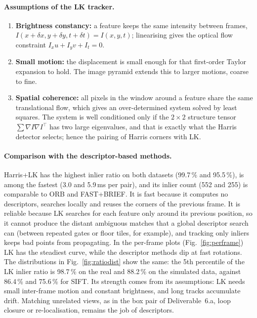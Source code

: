 \documentclass[11pt,a4paper]{article}
\begin{document}
\paragraph{Assumptions of the LK tracker.}
\begin{enumerate}
  \item \textbf{Brightness constancy:} a feature keeps the same intensity between
    frames, $I(x+\delta x, y+\delta y, t+\delta t)=I(x,y,t)$; linearising gives the optical
    flow constraint $I_x u + I_y v + I_t = 0$.
  \item \textbf{Small motion:} the displacement is small enough for that first-order
    Taylor expansion to hold. The image pyramid extends this to larger motions, coarse to
    fine.
  \item \textbf{Spatial coherence:} all pixels in the window around a feature share the
    same translational flow, which gives an over-determined system solved by least
    squares. The system is well conditioned only if the $2\times2$ structure tensor
    $\sum\nabla I\nabla I^\top$ has two large eigenvalues, and that is exactly what the
    Harris detector selects; hence the pairing of Harris corners with LK.
\end{enumerate}

\paragraph{Comparison with the descriptor-based methods.}
Harris+LK has the highest inlier ratio on both datasets (99.7\,\% and 95.5\,\%), is among
the fastest (3.0 and 5.9\,ms per pair), and its inlier count (552 and 255) is comparable
to ORB and FAST+BRIEF. It is fast because it computes no descriptors, searches locally
and reuses the corners of the previous frame. It is reliable because LK searches for
each feature only around its previous position, so it cannot produce the distant
ambiguous matches that a global descriptor search can (between repeated gates or floor
tiles, for example), and tracking only inliers keeps bad points from propagating. In
the per-frame plots (Fig.~\ref{fig:perframe}) LK has the steadiest curve, while the
descriptor methods dip at fast rotations. The distributions in
Fig.~\ref{fig:ratiodist} show the same: the 5th percentile of the LK inlier ratio is
98.7\,\% on the real and 88.2\,\% on the simulated data, against 86.4\,\% and 75.6\,\% for
SIFT. Its strength comes from its assumptions: LK
needs small inter-frame motion and constant brightness, and long tracks accumulate
drift. Matching unrelated views, as in the box pair of Deliverable~6.a, loop closure or
re-localisation, remains the job of descriptors.
\end{document}

